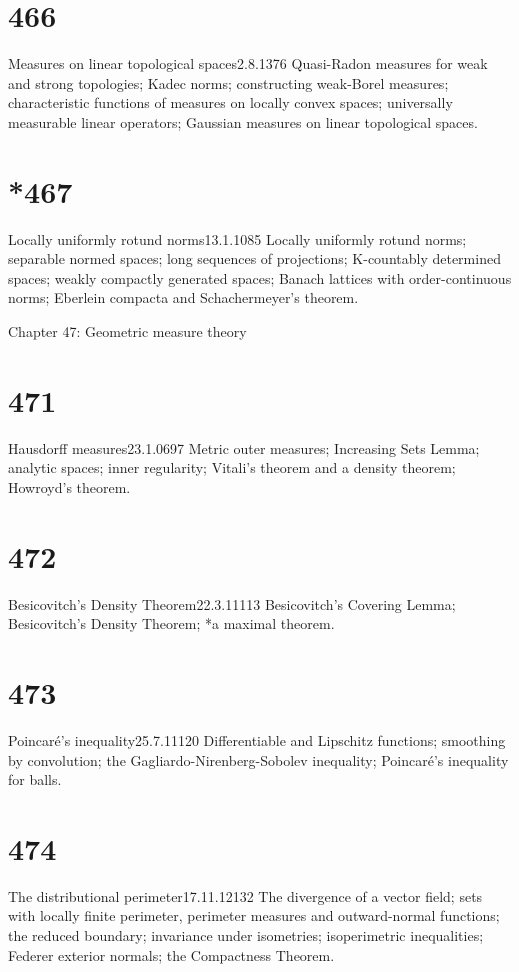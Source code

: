 \section{466}{Measures on linear topological spaces}{2.8.13}{76}{}
{Quasi-Radon measures for weak and strong topologies;  Kadec norms;
constructing weak-Borel measures;  characteristic functions of measures
on locally convex spaces;  universally measurable linear operators; 
Gaussian measures on linear topological spaces.}

\section{*467}{Locally uniformly rotund norms}{13.1.10}{85}{}
{Locally uniformly rotund norms;  separable normed spaces;  long
sequences of projections;  K-countably determined spaces;  weakly
compactly generated spaces;  Banach lattices with
order-continuous norms;  Eberlein compacta and Schachermeyer's theorem.}


  Chapter 47:  Geometric measure theory


\section{471}{Hausdorff measures}{23.1.06}{97}{}
{Metric outer measures;  Increasing Sets Lemma;  analytic spaces;  inner
regularity;  Vitali's theorem and a density theorem;  Howroyd's
theorem.}

\section{472}{Besicovitch's Density Theorem}{22.3.11}{113}{}
{Besicovitch's Covering Lemma;  Besicovitch's Density Theorem;  *a
maximal theorem.}

\section{473}{Poincar\'e's inequality}{25.7.11}{120}{}
{Differentiable and Lipschitz functions;  smoothing by convolution;  the
Gagliardo-\vthsp{}Nirenberg-\vthsp{}Sobolev inequality;
Poin\discretionary{-}{}{}car\'e's inequality for balls.}

\section{474}{The distributional perimeter}{17.11.12}{132}{}
{The divergence of a vector field;  sets with locally finite perimeter,
perimeter measures and outward-normal functions;  the reduced boundary;
invariance under isometries;  isoperimetric inequalities;  Federer
exterior normals;  the Compactness Theorem.}

